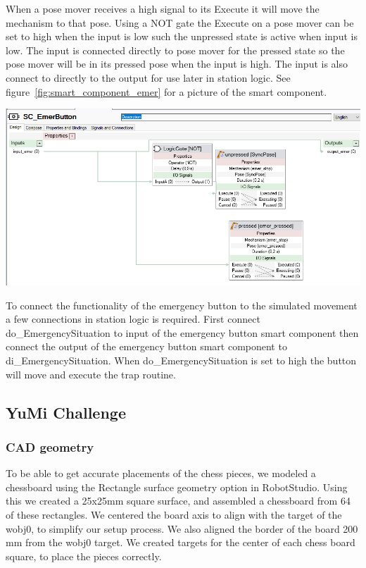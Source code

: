 \documentclass[a4paper,12pt]{article}
\begin{document}
When a pose mover receives a high signal to its Execute it will move the mechanism to that pose. Using a NOT gate the Execute on a pose mover can be set to high when the input is low such the unpressed state is active when input is low. The input is connected directly to pose mover for the pressed state so the pose mover will be in its pressed pose when the input is high. The input is also connect to directly to the output for use later in station logic. See figure~\ref{fig:smart_component_emer} for a picture of the smart component.
\begin{center}
    \includegraphics[width=0.8\linewidth]{SC_emer_button.png}
    \label{fig:smart_component_emer}
\end{center}
To connect the functionality of the emergency button to the simulated movement a few connections in station logic is required. First connect do\_EmergencySituation to input of the emergency button smart component then connect the output of the emergency button smart component to di\_EmergencySituation. When do\_EmergencySituation is set to high the button will move and execute the trap routine.

\subsection{YuMi Challenge}
\subsubsection{CAD geometry}
To be able to get accurate placements of the chess pieces, we modeled a chessboard using the Rectangle surface geometry option in RobotStudio. Using this we created a 25x25mm square surface, and assembled a chessboard from 64 of these rectangles. We centered the board axis to align with the target of the wobj0, to simplify our setup process. We also aligned the border of the board 200 mm from the wobj0 target. We created targets for the center of each chess board square, to place the pieces correctly. 
\end{document}
